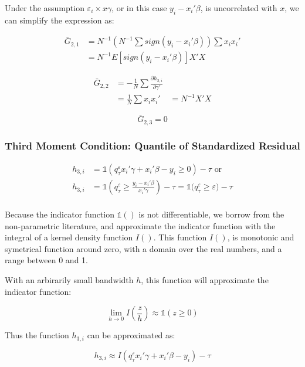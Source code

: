 \documentclass[
  authoryear,
  preprint,
  1p]{elsarticle}
\begin{document}
Under the assumption \(\varepsilon_i \times x\gamma\), or in this case
\(y_i-x_i'\beta\), is uncorrelated with \(x\), we can simplify the
expression as:

\[\begin{aligned}
\bar G_{2,1} &= N^{-1} \left(N^{-1}\sum sign(y_i-x_i'\beta)\right) \sum x_i x_i' \\
&= N^{-1} E[sign(y_i-x_i'\beta)] X'X
\end{aligned}
\]

\[\begin{aligned}
\bar G_{2,2} &= -\frac{1}{N} \sum \frac{\partial h_{2,i}}{\partial \gamma'} \\
             &=  \frac{1}{N} \sum x_i x_i' 
             &= N^{-1} X'X
\end{aligned}
\]

\[\bar G_{2,3}=0\]

\hypertarget{third-moment-condition-quantile-of-standardized-residual}{%
\subsubsection{Third Moment Condition: Quantile of Standardized
Residual}\label{third-moment-condition-quantile-of-standardized-residual}}

\[\begin{aligned}
h_{3,i} &= \mathbb{1}\left( q^\varepsilon_\tau x_i'\gamma +x_i'\beta - y_i \geq 0 \right) - \tau \text{ or}\\
h_{3,i} &= \mathbb{1}\left( q^\varepsilon_\tau  \geq \frac{y_i- x_i'\beta}{x_i'\gamma}  \right) - \tau = \mathbb{1}\big( q^\varepsilon_\tau  \geq \varepsilon  \big) - \tau \\
\end{aligned}
\]

Because the indicator function \(\mathbb{1}()\) is not differentiable,
we borrow from the non-parametric literature, and approximate the
indicator function with the integral of a kernel density function
\(I()\). This function \(I()\), is monotonic and symetrical function
around zero, with a domain over the real numbers, and a range between 0
and 1.

With an arbirarily small bandwidth \(h\), this function will approximate
the indicator function:

\[
\lim_{h\rightarrow 0} I\left(\frac{z}{h}\right) \approx \mathbb{1}(z\geq 0)
\]

Thus the function \(h_{3,i}\) can be approximated as:

\[h_{3,i} \approx I\left( q^\varepsilon_\tau x_i'\gamma +x_i'\beta - y_i  \right) - \tau\]
\end{document}
